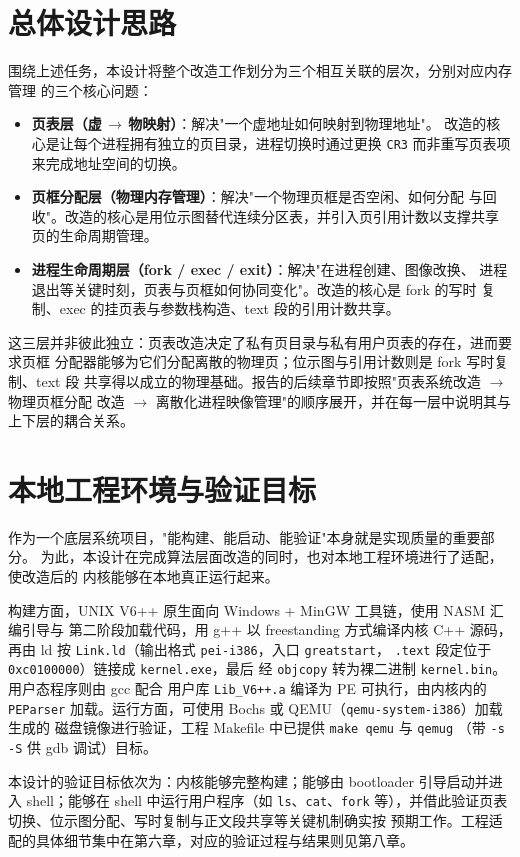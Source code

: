 \section{总体设计思路}
围绕上述任务，本设计将整个改造工作划分为三个相互关联的层次，分别对应内存管理
的三个核心问题：

\begin{itemize}
  \item \textbf{页表层（虚\,$\to$\,物映射）}：解决"一个虚地址如何映射到物理地址"。
        改造的核心是让每个进程拥有独立的页目录，进程切换时通过更换 \texttt{CR3}
        而非重写页表项来完成地址空间的切换。
  \item \textbf{页框分配层（物理内存管理）}：解决"一个物理页框是否空闲、如何分配
        与回收"。改造的核心是用位示图替代连续分区表，并引入页引用计数以支撑共享
        页的生命周期管理。
  \item \textbf{进程生命周期层（fork / exec / exit）}：解决"在进程创建、图像改换、
        进程退出等关键时刻，页表与页框如何协同变化"。改造的核心是 fork 的写时
        复制、exec 的挂页表与参数栈构造、text 段的引用计数共享。
\end{itemize}

这三层并非彼此独立：页表改造决定了私有页目录与私有用户页表的存在，进而要求页框
分配器能够为它们分配离散的物理页；位示图与引用计数则是 fork 写时复制、text 段
共享得以成立的物理基础。报告的后续章节即按照"页表系统改造 $\to$ 物理页框分配
改造 $\to$ 离散化进程映像管理"的顺序展开，并在每一层中说明其与上下层的耦合关系。

\section{本地工程环境与验证目标}
作为一个底层系统项目，"能构建、能启动、能验证"本身就是实现质量的重要部分。
为此，本设计在完成算法层面改造的同时，也对本地工程环境进行了适配，使改造后的
内核能够在本地真正运行起来。

构建方面，UNIX V6++ 原生面向 Windows + MinGW 工具链，使用 NASM 汇编引导与
第二阶段加载代码，用 g++ 以 freestanding 方式编译内核 C++ 源码，再由 ld 按
\texttt{Link.ld}（输出格式 \texttt{pei-i386}，入口 \texttt{greatstart}，
\texttt{.text} 段定位于 \texttt{0xc0100000}）链接成 \texttt{kernel.exe}，最后
经 \texttt{objcopy} 转为裸二进制 \texttt{kernel.bin}。用户态程序则由 gcc 配合
用户库 \texttt{Lib\_V6++.a} 编译为 PE 可执行，由内核内的 \texttt{PEParser}
加载。运行方面，可使用 Bochs 或 QEMU（\texttt{qemu-system-i386}）加载生成的
磁盘镜像进行验证，工程 Makefile 中已提供 \texttt{make qemu} 与 \texttt{qemug}
（带 \texttt{-s -S} 供 gdb 调试）目标。

本设计的验证目标依次为：内核能够完整构建；能够由 bootloader 引导启动并进入
shell；能够在 shell 中运行用户程序（如 \texttt{ls}、\texttt{cat}、\texttt{fork}
等），并借此验证页表切换、位示图分配、写时复制与正文段共享等关键机制确实按
预期工作。工程适配的具体细节集中在第六章，对应的验证过程与结果则见第八章。
